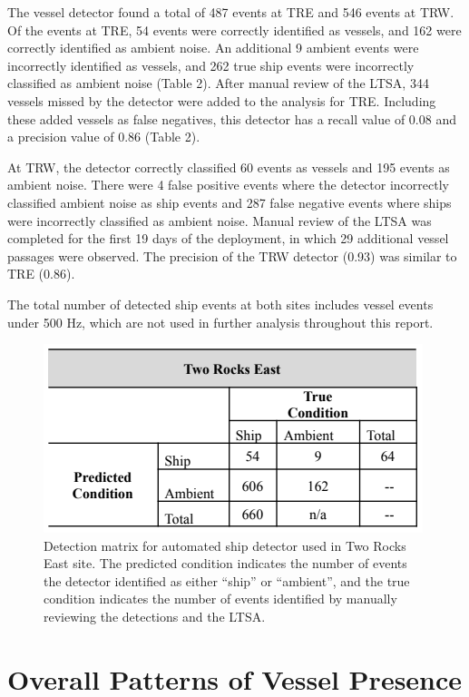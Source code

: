 \documentclass[
  letterpaper,
  oneside,
  open=any]{scrbook}
\begin{document}
The vessel detector found a total of 487 events at TRE and 546 events at
TRW. Of the events at TRE, 54 events were correctly identified as
vessels, and 162 were correctly identified as ambient noise. An
additional 9 ambient events were incorrectly identified as vessels, and
262 true ship events were incorrectly classified as ambient noise (Table
2). After manual review of the LTSA, 344 vessels missed by the detector
were added to the analysis for TRE. Including these added vessels as
false negatives, this detector has a recall value of 0.08 and a
precision value of 0.86 (Table 2).

At TRW, the detector correctly classified 60 events as vessels and 195
events as ambient noise. There were 4 false positive events where the
detector incorrectly classified ambient noise as ship events and 287
false negative events where ships were incorrectly classified as ambient
noise. Manual review of the LTSA was completed for the first 19 days of
the deployment, in which 29 additional vessel passages were observed.
The precision of the TRW detector (0.93) was similar to TRE (0.86).

The total number of detected ship events at both sites includes vessel
events under 500 Hz, which are not used in further analysis throughout
this report.

\begin{figure}[H]

{\centering \includegraphics{images/Table.2.PNG}

}

\caption{Detection matrix for automated ship detector used in Two Rocks
East site. The predicted condition indicates the number of events the
detector identified as either ``ship'' or ``ambient'', and the true
condition indicates the number of events identified by manually
reviewing the detections and the LTSA.}

\end{figure}%

\section{Overall Patterns of Vessel
Presence}\label{overall-patterns-of-vessel-presence}
\end{document}
